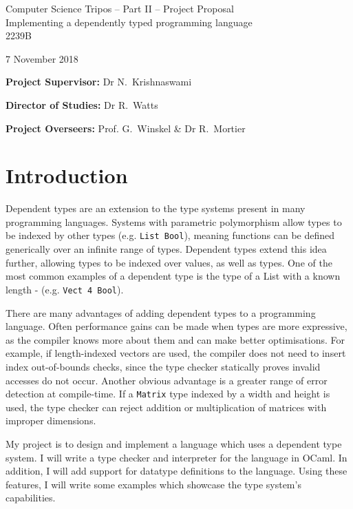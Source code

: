\documentclass[12pt,a4paper,twoside]{article}
\begin{document}
\begin{center}
\Large
Computer Science Tripos -- Part II -- Project Proposal\\[4mm]
\LARGE
Implementing a dependently typed programming language\\[4mm]

\large
2239B

7 November 2018
\end{center}

\vspace{5mm}

\textbf{Project Supervisor:} Dr N.~Krishnaswami

\textbf{Director of Studies:} Dr R.~Watts

\textbf{Project Overseers:} Prof. G.~Winskel \& Dr R.~Mortier


\section*{Introduction}

Dependent types are an extension to the type systems present in many programming languages.
Systems with parametric polymorphism allow types to be indexed by other types (e.g. \lstinline{List Bool}), meaning functions can be defined generically over an infinite range of types.
Dependent types extend this idea further, allowing types to be indexed over values, as well as types.
One of the most common examples of a dependent type is the type of a List with a known length - (e.g. \lstinline{Vect 4 Bool}).

There are many advantages of adding dependent types to a programming language.
Often performance gains can be made when types are more expressive, as the compiler knows more about them and can make better optimisations.
For example, if length-indexed vectors are used, the compiler does not need to insert index out-of-bounds checks, since the type checker statically proves invalid accesses do not occur.
Another obvious advantage is a greater range of error detection at compile-time.
If a \lstinline{Matrix} type indexed by a width and height is used, the type checker can reject addition or multiplication of matrices with improper dimensions.

My project is to design and implement a language which uses a dependent type system.
I will write a type checker and interpreter for the language in OCaml.
In addition, I will add support for datatype definitions to the language.
Using these features, I will write some examples which showcase the type system's capabilities.
\end{document}
